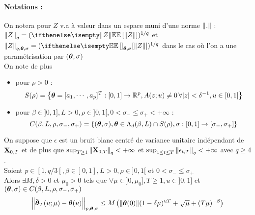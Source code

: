 \documentclass[a4paper,french]{article}
\begin{document}
\paragraph{Notations :}
On notera pour $Z$ v.a à valeur dans un espace muni d'une norme ${ \left\| . \right\|}$ : $\norm{Z}_q = (\EE[\norm{Z}])^{1/q}$ et  $\norm{Z}_{q,\bftheta,\sigma} = (\EE_{\bftheta,\sigma}[\norm{Z}])^{1/q}$ dans le cas où l'on a une paramétrisation par $(\boldsymbol{\theta},\sigma)$ \\
On note de plus 
\begin{itemize}
\item pour $\rho > 0$ : 
$$
S(\rho) = { \left\lbrace \boldsymbol{\theta} = [a_1, \cdots , a_p]^T : [0,1] \to \mathbb{R}^p, A(z;u)\neq 0 \, \forall { \left| z \right|} < \delta^{-1}, u\in [0,1] \right\rbrace }
$$
\item pour $\beta \in ]0,1], L >0, \rho \in ]0,1[, 0 < \sigma_- \leq \sigma_+ < +\infty $ : 
$$
C(\beta, L, \rho, \sigma_-, \sigma_+) = { \left\lbrace (\boldsymbol{\theta},\sigma), \boldsymbol{\theta} \in \Lambda_d(\beta,L) \cap S(\rho), \sigma : [0,1] \to [\sigma_-, \sigma_+] \right\rbrace }
$$
\end{itemize}

\begin{Thm}
On suppose que $\epsilon$ est un bruit blanc centré de variance unitaire indépendant de $\mathbf{X}_{0,T}$ et de plus que $\sup_{T \geq 1} { \left\| \mathbf{X}_{0,T} \right\|}_q < +\infty$ et $\sup_{1\leq t \leq T} { \left\| \epsilon_{t,T} \right\|}_q < +\infty$ avec $q \geq 4$. \\
Soient $p\in [1,q/3[, \beta\in ]0,1], L>0, \rho \in ]0,1[$ et $0 < \sigma_{-} \leq \sigma_{+}$ \\
Alors $\exists M,\delta > 0$ et $\mu_0 >0$ tels que $\forall \mu \in ]0,\mu_0], T \geq 1, u\in ]0,1]$ et $(\boldsymbol{\theta}, \sigma) \in C(\beta, L, \rho, \sigma_-, \sigma_+)$ 
$$
{ \left\| \hat{\boldsymbol{\theta}}_T(u ; \mu) - \boldsymbol{\theta}(u) \right\|}_{p,\boldsymbol{\theta},\sigma} \leq M \left( { \left\| \boldsymbol{\theta}(0) \right\|}(1-\delta \mu)^{uT} + \sqrt{\mu} + (T\mu)^{-\beta} \right)
$$
\end{Thm}
\end{document}
